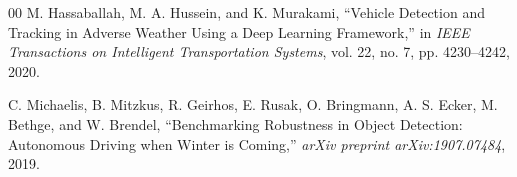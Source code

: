 \documentclass[conference]{IEEEtran}
\begin{document}
\begin{thebibliography}{00}
 M. Hassaballah, M. A. Hussein, and K. Murakami, ``Vehicle Detection and Tracking in Adverse Weather Using a Deep Learning Framework,'' in \textit{IEEE Transactions on Intelligent Transportation Systems}, vol. 22, no. 7, pp. 4230--4242, 2020.

 C. Michaelis, B. Mitzkus, R. Geirhos, E. Rusak, O. Bringmann, A. S. Ecker, M. Bethge, and W. Brendel, ``Benchmarking Robustness in Object Detection: Autonomous Driving when Winter is Coming,'' \textit{arXiv preprint arXiv:1907.07484}, 2019.

\end{thebibliography}
\end{document}
